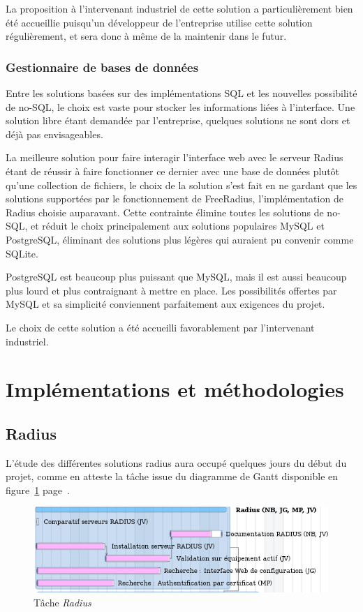 La proposition à l'intervenant industriel de cette solution a particulièrement bien été accueillie puisqu'un développeur de l'entreprise utilise cette solution régulièrement, et sera donc à même de la maintenir dans le futur.

\subsubsection{Gestionnaire de bases de données}

Entre les solutions basées sur des implémentations SQL et les nouvelles possibilité de no-SQL, le choix est vaste pour stocker les informations liées à l'interface. Une solution libre étant demandée par l'entreprise, quelques solutions ne sont dors et déjà pas envisageables. 

La meilleure solution pour faire interagir l'interface web avec le serveur Radius étant de réussir à faire fonctionner ce dernier avec une base de données plutôt qu'une collection de fichiers, le choix de la solution s'est fait en ne gardant que les solutions supportées par le fonctionnement de FreeRadius, l'implémentation de Radius choisie auparavant. Cette contrainte élimine toutes les solutions de no-SQL, et réduit le choix principalement aux solutions populaires MySQL et PostgreSQL, éliminant des solutions plus légères qui auraient pu convenir comme SQLite.

PostgreSQL est beaucoup plus puissant que MySQL, mais il est aussi beaucoup plus lourd et plus contraignant à mettre en place. Les possibilités offertes par MySQL et sa simplicité conviennent parfaitement aux exigences du projet.

Le choix de cette solution a été accueilli favorablement par l'intervenant industriel.

\section{Implémentations et méthodologies}
\subsection{Radius}

L'étude des différentes solutions radius aura occupé quelques jours du début du projet, comme en atteste la tâche issue du diagramme de Gantt disponible en figure~\ref{gantt_radius} page~\pageref{gantt_radius}.

\begin{figure}[!h]
	\label{gantt_radius}
	\begin{center}
		\includegraphics[width=350pt]{img/gantt_radius.png}
	\end{center}
	\caption{Tâche \textit{Radius}}
\end{figure}

